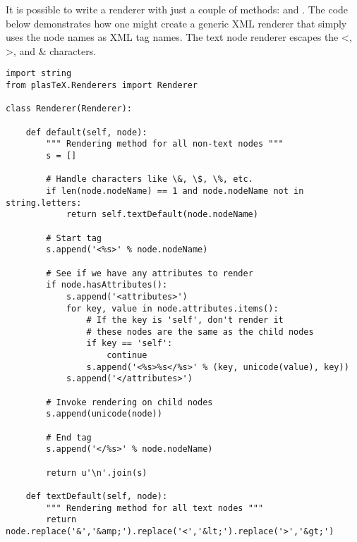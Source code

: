 It is possible to write a renderer with just a couple of methods:
 and .
The code below demonstrates how one might create a generic XML
renderer that simply uses the node names as XML tag names.  
The text node renderer escapes the <, >, and \& characters.
\begin{verbatim}
import string
from plasTeX.Renderers import Renderer

class Renderer(Renderer):
    
    def default(self, node):
        """ Rendering method for all non-text nodes """
        s = []

        # Handle characters like \&, \$, \%, etc.
        if len(node.nodeName) == 1 and node.nodeName not in string.letters:
            return self.textDefault(node.nodeName)

        # Start tag
        s.append('<%s>' % node.nodeName)

        # See if we have any attributes to render
        if node.hasAttributes():
            s.append('<attributes>')
            for key, value in node.attributes.items():
                # If the key is 'self', don't render it
                # these nodes are the same as the child nodes
                if key == 'self':
                    continue
                s.append('<%s>%s</%s>' % (key, unicode(value), key))
            s.append('</attributes>')

        # Invoke rendering on child nodes
        s.append(unicode(node))

        # End tag
        s.append('</%s>' % node.nodeName)

        return u'\n'.join(s)

    def textDefault(self, node):
        """ Rendering method for all text nodes """
        return node.replace('&','&amp;').replace('<','&lt;').replace('>','&gt;')
\end{verbatim}

